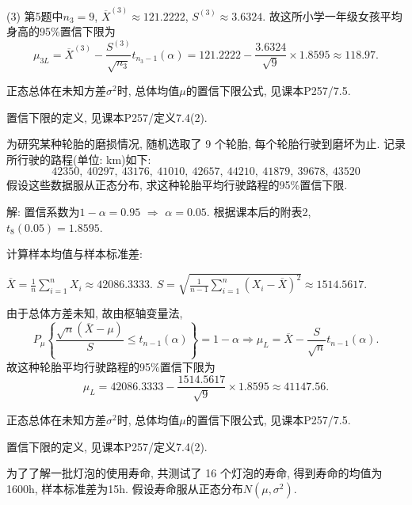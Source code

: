 \documentclass[standard]{ExBook}
\renewenvironment{shaded}{%
  \def\FrameCommand{\fboxsep=\FrameSep \colorbox{shadecolor}}%
  \MakeFramed{\advance\hsize-\width \FrameRestore}%
}{%
  \endMakeFramed
}
\begin{document}
\begin{qitems}
(3) 第5题中$n_3=9$, $\overline{X}^{(3)}\approx121.2222$, $S^{(3)}\approx3.6324$. 故这所小学一年级女孩平均身高的95\%置信下限为
$$
\mu_{3L}
=
\overline{X}^{(3)}
-\frac{S^{(3)}}{\sqrt{n_3}}t_{n_3-1}(\alpha)
=
121.2222-\frac{3.6324}{\sqrt{9}}\times1.8595
\approx118.97.
$$

\textcolor{themeColor}{\selectfont {}
正态总体在未知方差$\sigma^2$时, 总体均值$\mu$的置信下限公式, 见课本P257/7.5.}

\textcolor{themeColor}{\selectfont {}
置信下限的定义, 见课本P257/定义7.4(2).}

\vspace{2.5cm-5em}

    \begin{bbox}
    \begin{shaded}
        \qitem
为研究某种轮胎的磨损情况, 随机选取了 9 个轮胎, 每个轮胎行驶到磨坏为止. 记录所行驶的路程(单位: km)如下:
$$42350,\ 40297,\ 43176,\ 41010,\ 42657,\ 44210,\ 41879,\ 39678,\ 43520$$
假设这些数据服从正态分布, 求这种轮胎平均行驶路程的95\%置信下限.
    \end{shaded}
    \end{bbox}

\vspace{\dimexpr2.5cm-5em\relax}

解: 置信系数为$1-\alpha=0.95$ $\Longrightarrow$ $\alpha=0.05$. 根据课本后的附表2, $t_8(0.05)=1.8595$.

计算样本均值与样本标准差:

$\overline{X}=\frac{1}{n}\sum_{i=1}^nX_i\approx42086.3333$. 
$S=\sqrt{\frac{1}{n-1}\sum_{i=1}^n(X_i-\overline{X})^2}\approx1514.5617$.

由于总体方差未知, 故由枢轴变量法,
$$
P_{\mu}\left\{
\frac{\sqrt{n}(\overline{X}-\mu)}{S}
\leq t_{n-1}(\alpha)
\right\}
=
1-\alpha
\Longrightarrow
\mu_L
=
\overline{X}-\frac{S}{\sqrt{n}}t_{n-1}(\alpha).
$$
故这种轮胎平均行驶路程的95\%置信下限为
$$
\mu_L
=
42086.3333-\frac{1514.5617}{\sqrt{9}}\times1.8595
\approx41147.56.
$$

\textcolor{themeColor}{\selectfont {}
正态总体在未知方差$\sigma^2$时, 总体均值$\mu$的置信下限公式, 见课本P257/7.5.}

\textcolor{themeColor}{\selectfont {}
置信下限的定义, 见课本P257/定义7.4(2).}

\vspace{2.5cm-5em}

    \begin{bbox}
    \begin{shaded}
        \qitem
为了了解一批灯泡的使用寿命, 共测试了 16 个灯泡的寿命, 得到寿命的均值为1600h, 样本标准差为15h. 假设寿命服从正态分布$N(\mu,\sigma^2)$.


\end{shaded}
\end{bbox}
\end{qitems}
\end{document}
